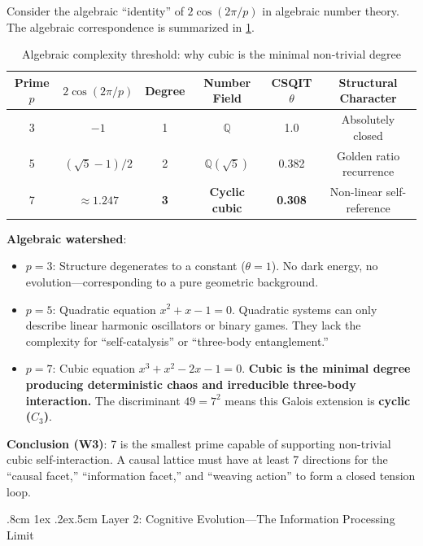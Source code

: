 \documentclass[aps,prd,twocolumn,nofootinbib,floatfix]{revtex4-2}
\makeatletter
\def\subsubsection{%
  \@startsection{subsubsection}{3}{\z@}
    {.8cm \@plus1ex \@minus .2ex}{.5cm}
    {\normalfont\normalsize\itshape\centering}%
}
\makeatother
\begin{document}
Consider the algebraic ``identity'' of $2\cos(2\pi/p)$ in algebraic number theory. The algebraic correspondence is summarized in \cref{tab:algebraic}.

\begin{table}[!t]
\centering
\begin{tabular}{cccccc}
\hline
Prime $p$ & $2\cos(2\pi/p)$ & Degree & Number Field & CSQIT $\theta$ & Structural Character \\
\hline
3 & $-1$ & 1 & $\mathbb{Q}$ & 1.0 & Absolutely closed \\
5 & $(\sqrt{5}-1)/2$ & 2 & $\mathbb{Q}(\sqrt{5})$ & 0.382 & Golden ratio recurrence \\
7 & $\approx 1.247$ & \textbf{3} & \textbf{Cyclic cubic} & \textbf{0.308} & Non-linear self-reference \\
\hline
\end{tabular}
\caption{Algebraic complexity threshold: why cubic is the minimal non-trivial degree}
\label{tab:algebraic}
\end{table}

\textbf{Algebraic watershed}:
\begin{itemize}
    \item \textbf{$p=3$}: Structure degenerates to a constant ($\theta=1$). No dark energy, no evolution---corresponding to a pure geometric background.
    \item \textbf{$p=5$}: Quadratic equation $x^2 + x - 1 = 0$. Quadratic systems can only describe linear harmonic oscillators or binary games. They lack the complexity for ``self-catalysis'' or ``three-body entanglement.''
    \item \textbf{$p=7$}: Cubic equation $x^3 + x^2 - 2x - 1 = 0$. \textbf{Cubic is the minimal degree producing deterministic chaos and irreducible three-body interaction.} The discriminant $49 = 7^2$ means this Galois extension is \textbf{cyclic ($C_3$)}.
\end{itemize}

\textbf{Conclusion (W3)}: 7 is the smallest prime capable of supporting non-trivial cubic self-interaction. A causal lattice must have at least 7 directions for the ``causal facet,'' ``information facet,'' and ``weaving action'' to form a closed tension loop.

\subsubsection{Layer 2: Cognitive Evolution---The Information Processing Limit}
\end{document}
